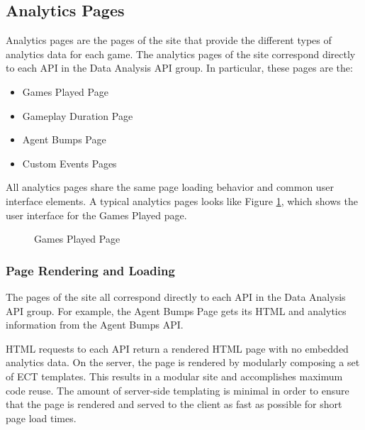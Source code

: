 \subsection{Analytics Pages}

Analytics pages are the pages of the site that provide the different types of analytics data for each game. The analytics pages of the site correspond directly to each API in the Data Analysis API group. In particular, these pages are the:
	\begin{itemize}
		\item Games Played Page
		\item Gameplay Duration Page
		\item Agent Bumps Page
		\item Custom Events Pages
	\end{itemize}
All analytics pages share the same page loading behavior and common user interface elements. A typical analytics pages looks like Figure \ref{fig:games_played}, which shows the user interface for the Games Played page.

\begin{figure}[H]
	\caption[Analytics Site: ``Games Played'' UI]{\label{fig:games_played} Games Played Page}
\end{figure}

\subsubsection{Page Rendering and Loading}

The pages of the site all correspond directly to each API in the Data Analysis API group. For example, the Agent Bumps Page gets its HTML and analytics information from the Agent Bumps API.

HTML requests to each API return a rendered HTML page with no embedded analytics data. On the server, the page is rendered by modularly composing a set of ECT templates. This results in a modular site and accomplishes maximum code reuse. The amount of server-side templating is minimal in order to ensure that the page is rendered and served to the client as fast as possible for short page load times.

